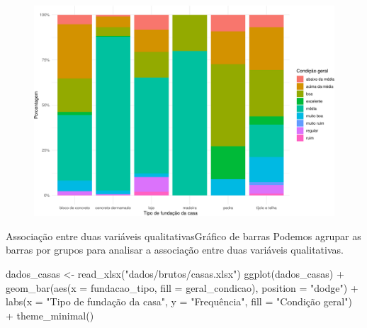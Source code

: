\documentclass[
  10pt,
  ignorenonframetext,
]{beamer}
\newenvironment{Shaded}{\begin{snugshade}}{\end{snugshade}}
\newcommand{\AttributeTok}[1]{\textcolor[rgb]{0.40,0.45,0.13}{#1}}
\newcommand{\FunctionTok}[1]{\textcolor[rgb]{0.28,0.35,0.67}{#1}}
\newcommand{\NormalTok}[1]{\textcolor[rgb]{0.00,0.23,0.31}{#1}}
\newcommand{\OtherTok}[1]{\textcolor[rgb]{0.00,0.23,0.31}{#1}}
\newcommand{\SpecialCharTok}[1]{\textcolor[rgb]{0.37,0.37,0.37}{#1}}
\newcommand{\StringTok}[1]{\textcolor[rgb]{0.13,0.47,0.30}{#1}}
\begin{document}
\begin{frame}
\begin{figure}

{\centering \includegraphics[width=1\textwidth,height=\textheight]{exploracao-visualizacao_files/figure-beamer/unnamed-chunk-135-1.pdf}

}

\end{figure}
\end{frame}

\begin{frame}[fragile]{Associação entre duas variáveis
qualitativas\newline Gráfico de barras}
\protect\hypertarget{associauxe7uxe3o-entre-duas-variuxe1veis-qualitativasgruxe1fico-de-barras}{}
Podemos agrupar as barras por grupos para analisar a associação entre
duas variáveis qualitativas.

\vspace{0.5cm}

\small

\begin{Shaded}
\begin{Highlighting}[]
\NormalTok{dados\_casas }\OtherTok{\textless{}{-}} \FunctionTok{read\_xlsx}\NormalTok{(}\StringTok{"dados/brutos/casas.xlsx"}\NormalTok{)}
\FunctionTok{ggplot}\NormalTok{(dados\_casas) }\SpecialCharTok{+}
  \FunctionTok{geom\_bar}\NormalTok{(}\FunctionTok{aes}\NormalTok{(}\AttributeTok{x =}\NormalTok{ fundacao\_tipo, }\AttributeTok{fill =}\NormalTok{ geral\_condicao),}
          \AttributeTok{position =} \StringTok{"dodge"}\NormalTok{) }\SpecialCharTok{+}
  \FunctionTok{labs}\NormalTok{(}\AttributeTok{x =} \StringTok{"Tipo de fundação da casa"}\NormalTok{, }\AttributeTok{y =} \StringTok{"Frequência"}\NormalTok{,}
      \AttributeTok{fill =} \StringTok{"Condição geral"}\NormalTok{) }\SpecialCharTok{+}
  \FunctionTok{theme\_minimal}\NormalTok{()}
\end{Highlighting}
\end{Shaded}

\normalsize
\end{frame}
\end{document}
